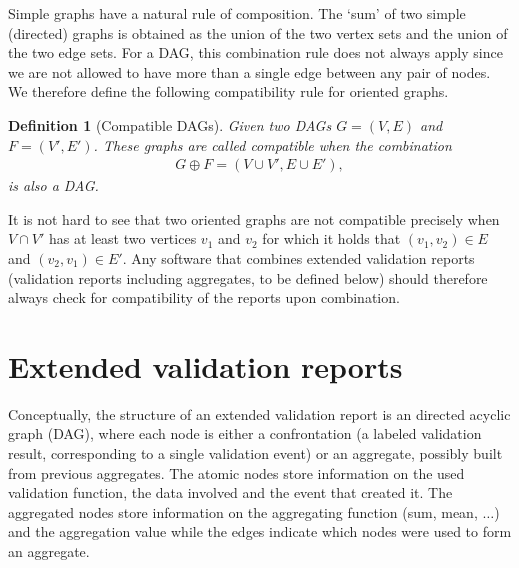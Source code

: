 \documentclass[a4paper, 11pt,titlepage]{article}
\newtheorem{definition}{Definition}
\begin{document}
Simple graphs have a natural rule of composition. The `sum' of two simple
(directed) graphs is obtained as the union of the two vertex sets and the union
of the two edge sets. For a DAG, this combination rule does not always apply
since we are not allowed to have more than a single edge between any pair of
nodes.  We therefore define the following compatibility rule for oriented
graphs.
\begin{definition}[Compatible DAGs]
Given two DAGs $G=(V,E)$ and $F=(V',E')$. These graphs are called
\emph{compatible} when the combination
\begin{align*}
G\oplus F = (V\cup V', E\cup E'),
\end{align*}
is also a DAG.
\end{definition}
It is not hard to see that two oriented graphs are not compatible precisely
when $V\cap V'$ has at least two vertices $v_1$ and $v_2$ for which it holds
that $(v_1,v_2)\in E$ and $(v_2,v_1)\in E'$. Any software that combines
extended validation reports (validation reports including aggregates, to be
defined below) should therefore always check for compatibility of the reports
upon combination.




\section{Extended validation reports}
Conceptually, the structure of an extended validation report is an directed
acyclic graph (DAG), where each node is either a confrontation (a labeled
validation result, corresponding to a single validation event) or an aggregate,
possibly built from previous aggregates. The atomic nodes store information on
the used validation function, the data involved and the event that created it.
The aggregated nodes store information on the aggregating function (sum, mean,
$\ldots$) and the aggregation value while the edges indicate which nodes were
used to form an aggregate. 
\end{document}
